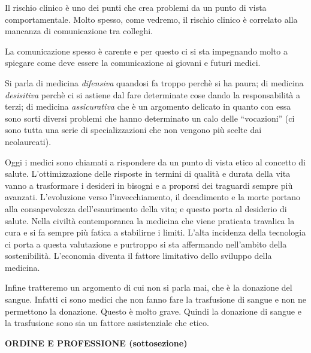 \documentclass[]{article}
\begin{document}
Il rischio clinico è uno dei punti che crea problemi da un punto di
vista comportamentale. Molto spesso, come vedremo, il rischio clinico è
correlato alla mancanza di comunicazione tra colleghi.

La comunicazione spesso è carente e per questo ci si sta impegnando
molto a spiegare come deve essere la comunicazione ai giovani e futuri
medici.

Si parla di medicina \emph{difensiva} quandosi fa troppo perchè si ha
paura; di medicina \emph{desisitiva} perchè ci si astiene dal fare
determinate cose dando la responsabilità a terzi; di medicina
\emph{assicurativa} che è un argomento delicato in quanto con essa sono
sorti diversi problemi che hanno determinato un calo delle ``vocazioni''
(ci sono tutta una serie di specializzazioni che non vengono più scelte
dai neolaureati).

Oggi i medici sono chiamati a rispondere da un punto di vista etico al
concetto di salute. L'ottimizzazione delle risposte in termini di
qualità e durata della vita vanno a trasformare i desideri in bisogni e
a proporsi dei traguardi sempre più avanzati. L'evoluzione verso
l'invecchiamento, il decadimento e la morte portano alla consapevolezza
dell'esaurimento della vita; e questo porta al desiderio di salute.
Nella civiltà contemporanea la medicina che viene praticata travalica la
cura e si fa sempre più fatica a stabilirne i limiti. L'alta incidenza
della tecnologia ci porta a questa valutazione e purtroppo si sta
affermando nell'ambito della sostenibilità. L'economia diventa il
fattore limitativo dello sviluppo della medicina.

Infine tratteremo un argomento di cui non si parla mai, che è la
donazione del sangue. Infatti ci sono medici che non fanno fare la
trasfusione di sangue e non ne permettono la donazione. Questo è molto
grave. Quindi la donazione di sangue e la trasfusione sono sia un
fattore assistenziale che etico.

\textbf{ORDINE E PROFESSIONE (sottosezione)}
\end{document}
